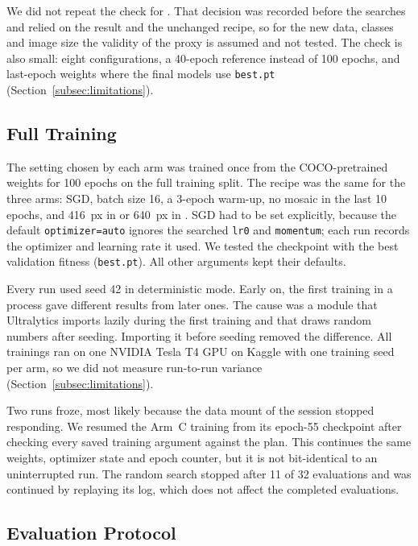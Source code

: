 We did not repeat the check for \gentwo. That decision was recorded before the \gentwo searches and relied on the \genone result and the unchanged recipe, so for the new data, classes and image size the validity of the proxy is assumed and not tested. The check is also small: eight configurations, a 40-epoch reference instead of 100 epochs, and last-epoch weights where the final models use \texttt{best.pt} (Section~\ref{subsec:limitations}).

\subsection{Full Training}
\label{subsec:training}

The setting chosen by each arm was trained once from the COCO-pretrained weights for 100 epochs on the full training split. The recipe was the same for the three arms: SGD, batch size 16, a 3-epoch warm-up, no mosaic in the last 10 epochs, and 416~px in \genone or 640~px in \gentwo. SGD had to be set explicitly, because the default \texttt{optimizer=auto} ignores the searched \texttt{lr0} and \texttt{momentum}; each run records the optimizer and learning rate it used. We tested the checkpoint with the best validation fitness (\texttt{best.pt}). All other arguments kept their defaults.

Every run used seed 42 in deterministic mode. Early on, the first training in a process gave different results from later ones. The cause was a module that Ultralytics imports lazily during the first training and that draws random numbers after seeding. Importing it before seeding removed the difference. All trainings ran on one NVIDIA Tesla T4 GPU on Kaggle with one training seed per arm, so we did not measure run-to-run variance (Section~\ref{subsec:limitations}).

Two \gentwo runs froze, most likely because the data mount of the session stopped responding. We resumed the Arm~C training from its epoch-55 checkpoint after checking every saved training argument against the plan. This continues the same weights, optimizer state and epoch counter, but it is not bit-identical to an uninterrupted run. The random search stopped after 11 of 32 evaluations and was continued by replaying its log, which does not affect the completed evaluations.

\subsection{Evaluation Protocol}
\label{subsec:eval}

